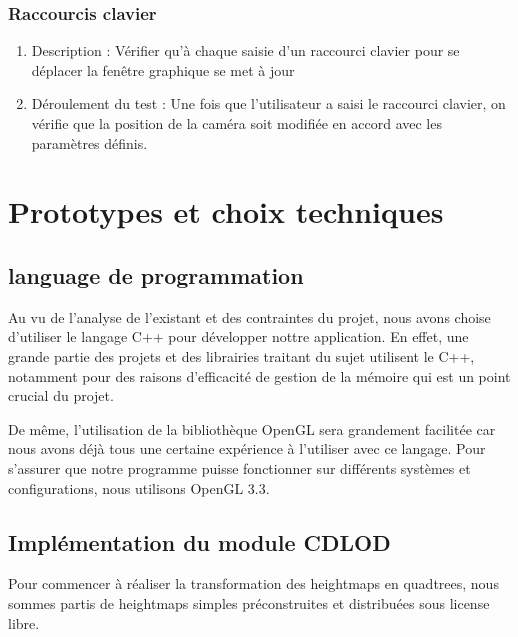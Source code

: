 \documentclass[12pt]{report}
\begin{document}
\subsection{Raccourcis clavier}
\begin{enumerate}
    \item Description : Vérifier qu'à chaque saisie d'un raccourci clavier pour se déplacer la fenêtre graphique se met à jour
    \item Déroulement du test : Une fois que l'utilisateur a saisi le raccourci clavier, on vérifie que la position de la caméra soit modifiée en accord avec les paramètres définis.
\end{enumerate}

\chapter{Prototypes et choix techniques}

\section{language de programmation}

Au vu de l'analyse de l'existant et des contraintes du projet, nous avons choise d'utiliser le langage C++ pour développer nottre application. En effet, une grande partie des projets et des librairies traitant du sujet utilisent le C++, notamment pour des raisons d'efficacité de gestion de la mémoire qui est un point crucial du projet.

De même, l'utilisation de la bibliothèque OpenGL sera grandement facilitée car nous avons déjà tous une certaine expérience à l'utiliser avec ce langage. Pour s'assurer que notre programme puisse fonctionner sur différents systèmes et configurations, nous utilisons OpenGL 3.3.

\section{Implémentation du module CDLOD}

Pour commencer à réaliser la transformation des heightmaps en quadtrees, nous sommes partis de heightmaps simples préconstruites et distribuées sous license libre.
\end{document}
